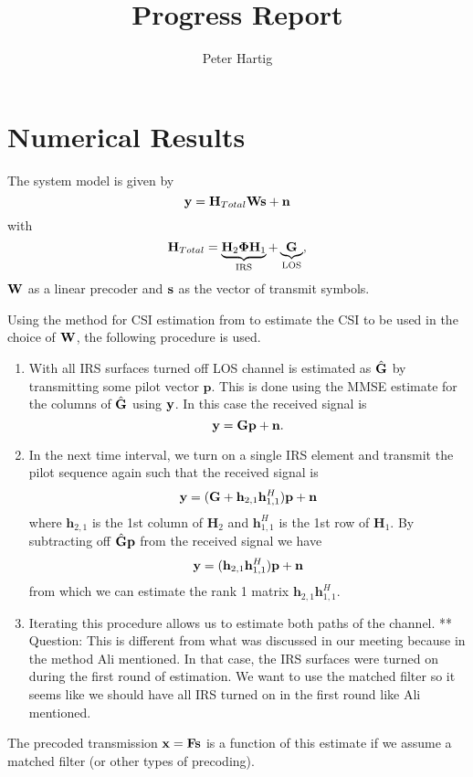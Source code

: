 \documentclass[12pt,a4paper]{report}
\title{Progress Report}
\author{Peter Hartig}
\begin{document}
\maketitle
\tableofcontents

\section{Numerical Results}
The system model is given by 
\begin{equation}
\mathbf{y} = \mathbf{H}_{Total} \mathbf{W} \mathbf{s}  + \mathbf{n}
\end{equation}
with 
	\begin{equation*}
	\mathbf{H}_{Total} = \underbrace{\mathbf{H}_{2}\boldsymbol{\Phi}\mathbf{H}_{1}}_{\text{IRS}} + \underbrace{\mathbf{G}}_{\text{LOS}},
	\end{equation*}
	$\mathbf{W}$ as a linear precoder and $\mathbf{s}$ as the vector of transmit symbols.
	\par
	Using the method for CSI estimation from \cite{nadeem2019intelligent} to estimate the CSI to be used in the choice of $\mathbf{W}$, the following procedure is used. 
	\begin{enumerate}
	\item
		With all IRS surfaces turned off LOS channel is estimated as $\hat{\mathbf{G}}$ by 
		transmitting some pilot vector $\mathbf{p}$. This is done using the MMSE estimate for the columns of $\hat{\mathbf{G}}$ using $\mathbf{y}$.
		In this case the received signal is 
			\begin{equation*}
			\mathbf{y} = \mathbf{G}\mathbf{p}  + \mathbf{n}.
			\end{equation*}
			
	\item 	
		In the next time interval, we turn on a single IRS element and transmit the pilot sequence again such that the received signal is 
			\begin{equation*}
			\mathbf{y} = (\mathbf{G} + \mathbf{h}_{2,1}\mathbf{h}^H_{1,1}  )\mathbf{p}  + \mathbf{n}
			\end{equation*}
			where $\mathbf{h}_{2,1}$ is the 1st column of $ \mathbf{H}_{2}$ and $\mathbf{h}_{1,1}^H$  is the 1st row of $\mathbf{H}_{1}$.
			By subtracting off $\hat{\mathbf{G}}\mathbf{p}$ from the received signal we have 
						\begin{equation*}
			\mathbf{y} = (\mathbf{h}_{2,1}\mathbf{h}^H_{1,1})\mathbf{p}  + \mathbf{n}
			\end{equation*}
			from which we can estimate the rank 1 matrix $\mathbf{h}_{2,1}\mathbf{h}^H_{1,1}$.
	\item 
		Iterating this procedure allows us to estimate both paths of the channel. 
		** Question: This is different from what was discussed in our meeting because in the method Ali mentioned. In that case, the IRS surfaces were turned on during the
		first round of estimation. We want to use the matched filter so it seems like we should have all IRS turned on in the first round like Ali mentioned. 
	\end{enumerate}
The precoded transmission $\mathbf{x} = \mathbf{F}\mathbf{s}$ is a function of this estimate if we assume a matched filter (or other types of precoding).


\end{document}
